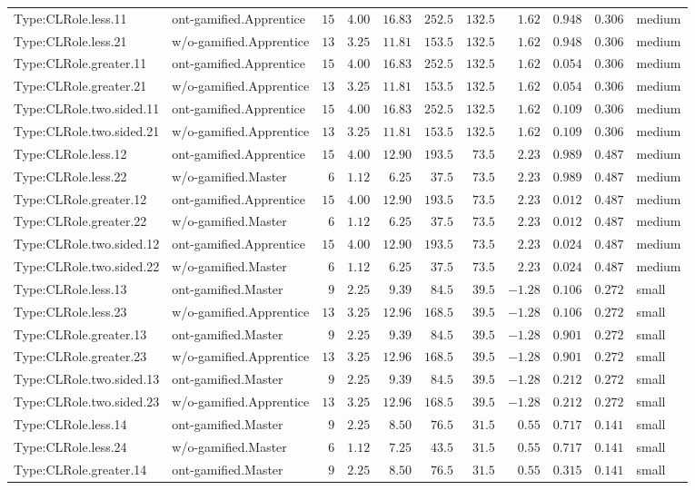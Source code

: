 \documentclass[6pt,a4paper]{article}
\begin{document}
{\begin{longtable}{llrrrrrrrrl}
Type:CLRole.less.11&ont-gamified.Apprentice&$15$&$4.00$&$16.83$&$252.5$&$132.5$&$ 1.62$&$0.948$&$0.306$&medium\tabularnewline
Type:CLRole.less.21&w/o-gamified.Apprentice&$13$&$3.25$&$11.81$&$153.5$&$132.5$&$ 1.62$&$0.948$&$0.306$&medium\tabularnewline
Type:CLRole.greater.11&ont-gamified.Apprentice&$15$&$4.00$&$16.83$&$252.5$&$132.5$&$ 1.62$&$0.054$&$0.306$&medium\tabularnewline
Type:CLRole.greater.21&w/o-gamified.Apprentice&$13$&$3.25$&$11.81$&$153.5$&$132.5$&$ 1.62$&$0.054$&$0.306$&medium\tabularnewline
Type:CLRole.two.sided.11&ont-gamified.Apprentice&$15$&$4.00$&$16.83$&$252.5$&$132.5$&$ 1.62$&$0.109$&$0.306$&medium\tabularnewline
Type:CLRole.two.sided.21&w/o-gamified.Apprentice&$13$&$3.25$&$11.81$&$153.5$&$132.5$&$ 1.62$&$0.109$&$0.306$&medium\tabularnewline
Type:CLRole.less.12&ont-gamified.Apprentice&$15$&$4.00$&$12.90$&$193.5$&$ 73.5$&$ 2.23$&$0.989$&$0.487$&medium\tabularnewline
Type:CLRole.less.22&w/o-gamified.Master&$ 6$&$1.12$&$ 6.25$&$ 37.5$&$ 73.5$&$ 2.23$&$0.989$&$0.487$&medium\tabularnewline
Type:CLRole.greater.12&ont-gamified.Apprentice&$15$&$4.00$&$12.90$&$193.5$&$ 73.5$&$ 2.23$&$0.012$&$0.487$&medium\tabularnewline
Type:CLRole.greater.22&w/o-gamified.Master&$ 6$&$1.12$&$ 6.25$&$ 37.5$&$ 73.5$&$ 2.23$&$0.012$&$0.487$&medium\tabularnewline
Type:CLRole.two.sided.12&ont-gamified.Apprentice&$15$&$4.00$&$12.90$&$193.5$&$ 73.5$&$ 2.23$&$0.024$&$0.487$&medium\tabularnewline
Type:CLRole.two.sided.22&w/o-gamified.Master&$ 6$&$1.12$&$ 6.25$&$ 37.5$&$ 73.5$&$ 2.23$&$0.024$&$0.487$&medium\tabularnewline
Type:CLRole.less.13&ont-gamified.Master&$ 9$&$2.25$&$ 9.39$&$ 84.5$&$ 39.5$&$-1.28$&$0.106$&$0.272$&small\tabularnewline
Type:CLRole.less.23&w/o-gamified.Apprentice&$13$&$3.25$&$12.96$&$168.5$&$ 39.5$&$-1.28$&$0.106$&$0.272$&small\tabularnewline
Type:CLRole.greater.13&ont-gamified.Master&$ 9$&$2.25$&$ 9.39$&$ 84.5$&$ 39.5$&$-1.28$&$0.901$&$0.272$&small\tabularnewline
Type:CLRole.greater.23&w/o-gamified.Apprentice&$13$&$3.25$&$12.96$&$168.5$&$ 39.5$&$-1.28$&$0.901$&$0.272$&small\tabularnewline
Type:CLRole.two.sided.13&ont-gamified.Master&$ 9$&$2.25$&$ 9.39$&$ 84.5$&$ 39.5$&$-1.28$&$0.212$&$0.272$&small\tabularnewline
Type:CLRole.two.sided.23&w/o-gamified.Apprentice&$13$&$3.25$&$12.96$&$168.5$&$ 39.5$&$-1.28$&$0.212$&$0.272$&small\tabularnewline
Type:CLRole.less.14&ont-gamified.Master&$ 9$&$2.25$&$ 8.50$&$ 76.5$&$ 31.5$&$ 0.55$&$0.717$&$0.141$&small\tabularnewline
Type:CLRole.less.24&w/o-gamified.Master&$ 6$&$1.12$&$ 7.25$&$ 43.5$&$ 31.5$&$ 0.55$&$0.717$&$0.141$&small\tabularnewline
Type:CLRole.greater.14&ont-gamified.Master&$ 9$&$2.25$&$ 8.50$&$ 76.5$&$ 31.5$&$ 0.55$&$0.315$&$0.141$&small\tabularnewline

\end{longtable}}
\end{document}
